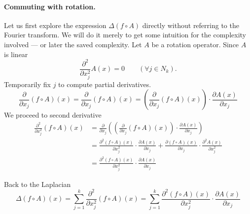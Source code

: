 \begin{enumerate}
\paragraph{Commuting with rotation.}
Let us first explore the expression \(\Delta(f \circ A)\)
directly without referring to the Fourier transform.
We will do it merely to get some intuition for 
the complexity involved --- or later the saved complexity.
Let $A$ be a rotation operator. Since $A$ is linear
\begin{equation*}
 \frac{\partial^2}{\partial x_j^2}A(x) = 0 \qquad (\forall j \in N_k).
\end{equation*}
Temporarily fix $j$ to compute partial derivatives.
\begin{equation*}
\frac{\partial}{\partial x_j} (f \circ A)(x)
= \frac{\partial}{\partial x_j} (f \circ A)(x) 
= \left(\frac{\partial}{\partial x_j}(f \circ A)(x)\right)
   \cdot
   \frac{\partial A(x)}{\partial x_j}
\end{equation*}
We proceed to second derivative
\begin{align*}
\frac{\partial^2}{\partial x_j^2} (f \circ A)(x)
&=   \frac{\partial}{\partial x_j} 
     \left(
      \left(\frac{\partial}{\partial x_j}(f \circ A)(x)\right)
      \cdot
      \frac{\partial A(x)}{\partial x_j}
     \right) \\
&=    \frac{\partial^2 (f \circ A)(x)}{\partial x_j^2}
      \cdot
      \frac{\partial A(x)}{\partial x_j} 
      +
       \frac{\partial (f \circ A)(x)}{\partial x_j}
       \cdot
       \frac{\partial^2 A(x)}{\partial x_j^2}
       \\
&=    \frac{\partial^2 (f \circ A)(x)}{\partial x_j^2}
      \cdot
      \frac{\partial A(x)}{\partial x_j} 
\end{align*}

Back to the Laplacian
\begin{equation*}
\Delta(f \circ A)(x) 
= \sum_{j=1}^k 
     \frac{\partial^2}{\partial x_j^2} (f \circ A)(x) 
= \sum_{j=1}^k 
      \frac{\partial^2 (f \circ A)(x)}{\partial x_j^2}
      \cdot
      \frac{\partial A(x)}{\partial x_j} 
\end{equation*}


\end{enumerate}
